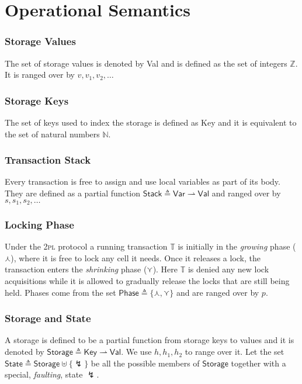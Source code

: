 \section{Operational Semantics}

\subsubsection{Storage Values}

The set of storage values is denoted by \textsf{Val} and is defined as the set of integers $\mathds{Z}$. It is ranged over by $v, v_1, v_2, \ldots$

\subsubsection{Storage Keys}

The set of keys used to index the storage is defined as \textsf{Key} and it is equivalent to the set of natural numbers $\mathds{N}$.

\subsubsection{Transaction Stack}

Every transaction is free to assign and use local variables as part of its body. They are defined as a partial function $\mathsf{Stack} \triangleq \mathsf{Var} \rightharpoonup \mathsf{Val}$ and ranged over by $s, s_1, s_2, \ldots$

\subsubsection{Locking Phase}

Under the \textsc{2pl} protocol a running transaction $\mathds{T}$ is initially in the \textit{growing} phase ($\curlywedge$), where it is free to lock any cell it needs. Once it releases a lock, the transaction enters the \textit{shrinking} phase ($\curlyvee$). Here $\mathds{T}$ is denied any new lock acquisitions while it is allowed to gradually release the locks that are still being held. Phases come from the set $\mathsf{Phase} \triangleq \{ \curlywedge, \curlyvee \}$ and are ranged over by $p$.

\subsubsection{Storage and State}

A storage is defined to be a partial function from storage keys to values and it is denoted by $\mathsf{Storage} \triangleq \mathsf{Key} \rightharpoonup \mathsf{Val}$. We use $h, h_1, h_2$ to range over it. Let the set $\mathsf{State} \triangleq \mathsf{Storage} \uplus \{\lightning\}$ be all the possible members of $\mathsf{Storage}$ together with a special, \textit{faulting}, state $\lightning$.

